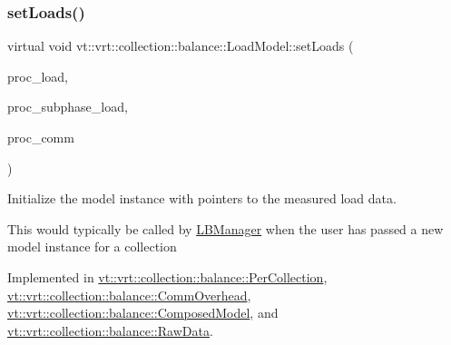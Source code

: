 \mbox{\label{classvt_1_1vrt_1_1collection_1_1balance_1_1_load_model_a621d040453688c70c168176b40cf90df}} 
\subsubsection{\texorpdfstring{set\+Loads()}{setLoads()}}
{\footnotesize\ttfamily virtual void vt\+::vrt\+::collection\+::balance\+::\+Load\+Model\+::set\+Loads (\begin{DoxyParamCaption}\item[{std\+::unordered\+\_\+map$<$ \hyperlink{namespacevt_a46ce6733d5cdbd735d561b7b4029f6d7}{Phase\+Type}, \hyperlink{namespacevt_1_1vrt_1_1collection_1_1balance_a45306ee4bf38fe3fb586d1ee2fa3d147}{Load\+Map\+Type} $>$ const $\ast$}]{proc\+\_\+load,  }\item[{std\+::unordered\+\_\+map$<$ \hyperlink{namespacevt_a46ce6733d5cdbd735d561b7b4029f6d7}{Phase\+Type}, \hyperlink{namespacevt_1_1vrt_1_1collection_1_1balance_a3d91523158c1025b7b665240072f3b7e}{Subphase\+Load\+Map\+Type} $>$ const $\ast$}]{proc\+\_\+subphase\+\_\+load,  }\item[{std\+::unordered\+\_\+map$<$ \hyperlink{namespacevt_a46ce6733d5cdbd735d561b7b4029f6d7}{Phase\+Type}, \hyperlink{namespacevt_1_1vrt_1_1collection_1_1balance_a10860c956804d644db54a16012352728}{Comm\+Map\+Type} $>$ const $\ast$}]{proc\+\_\+comm }\end{DoxyParamCaption})\hspace{0.3cm}{\ttfamily [pure virtual]}}



Initialize the model instance with pointers to the measured load data. 

This would typically be called by \hyperlink{structvt_1_1vrt_1_1collection_1_1balance_1_1_l_b_manager}{L\+B\+Manager} when the user has passed a new model instance for a collection 

Implemented in \hyperlink{structvt_1_1vrt_1_1collection_1_1balance_1_1_per_collection_ad749f0ca3690c9e58d4b3ab882ed4cf3}{vt\+::vrt\+::collection\+::balance\+::\+Per\+Collection}, \hyperlink{structvt_1_1vrt_1_1collection_1_1balance_1_1_comm_overhead_a4c74d8adf7fa0fbc5e4767397b479305}{vt\+::vrt\+::collection\+::balance\+::\+Comm\+Overhead}, \hyperlink{classvt_1_1vrt_1_1collection_1_1balance_1_1_composed_model_a2f9013d1f135574a03fe5de70ac11862}{vt\+::vrt\+::collection\+::balance\+::\+Composed\+Model}, and \hyperlink{structvt_1_1vrt_1_1collection_1_1balance_1_1_raw_data_a782bcf1ecfd0a88ded3e98c83f08cc6f}{vt\+::vrt\+::collection\+::balance\+::\+Raw\+Data}.

